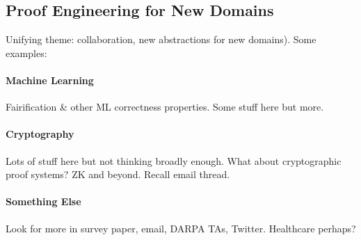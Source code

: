 \subsection*{Proof Engineering for New Domains}

Unifying theme: collaboration, new abstractions for new domains). Some examples:

\paragraph{Machine Learning} Fairification \& other ML correctness properties. Some stuff here but more.

\paragraph{Cryptography} Lots of stuff here but not thinking broadly enough. What about cryptographic proof systems? ZK and beyond. Recall email thread.

\paragraph{Something Else} Look for more in survey paper, email, DARPA TAs, Twitter. Healthcare perhaps? %
